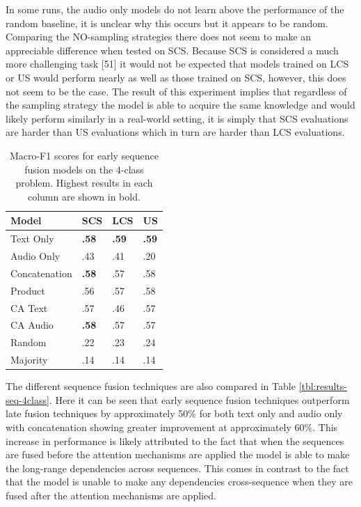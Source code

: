 \documentclass[twocolumn,twoside]{article}
\begin{document}
In some runs, the audio only models do not learn above the performance
of the random baseline, it is unclear why this occurs but it appears to
be random. Comparing the NO-sampling strategies there does not seem to
make an appreciable difference when tested on SCS. Because SCS is
considered a much more challenging task {[}51{]} it would not be
expected that models trained on LCS or US would perform nearly as well
as those trained on SCS, however, this does not seem to be the case. The
result of this experiment implies that regardless of the sampling
strategy the model is able to acquire the same knowledge and would
likely perform similarly in a real-world setting, it is simply that SCS
evaluations are harder than US evaluations which in turn are harder than
LCS evaluations.

\begin{table}[h]
\centering
\caption{Macro-F1 scores for early sequence fusion models on the 4-class problem. Highest results in each column are shown in bold.\label{tbl:results-early-4class}}
\begin{tabular}{|l|lll|}
\hline
Model         & SCS          & LCS          & US          \\ \hline
Text Only     & \textbf{.58} & \textbf{.59} & \textbf{.59} \\
Audio Only    & .43          & .41          & .20          \\ \hline
Concatenation & \textbf{.58} & .57          & .58          \\
Product       & .56          & .57          & .58          \\
CA Text       & .57          & .46          & .57          \\
CA Audio      & \textbf{.58} & .57          & .57          \\ \hline
Random        & .22          & .23          & .24          \\
Majority      & .14          & .14          & .14          \\ \hline
\end{tabular}
\end{table}

The different sequence fusion techniques are also compared in Table
\ref{tbl:results-seq-4class}. Here it can be seen that early sequence
fusion techniques outperform late fusion techniques by approximately
50\% for both text only and audio only with concatenation showing
greater improvement at approximately 60\%. This increase in performance
is likely attributed to the fact that when the sequences are fused
before the attention mechanisms are applied the model is able to make
the long-range dependencies across sequences. This comes in contrast to
the fact that the model is unable to make any dependencies
cross-sequence when they are fused after the attention mechanisms are
applied.
\end{document}
